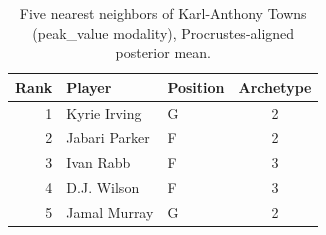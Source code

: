 \begin{table}[htbp]
  \centering\small
  \begin{tabular}{rllc}
    \toprule
    Rank & Player & Position & Archetype \\
    \midrule
    1 & Kyrie Irving & G & 2 \\
    2 & Jabari Parker & F & 2 \\
    3 & Ivan Rabb & F & 3 \\
    4 & D.J. Wilson & F & 3 \\
    5 & Jamal Murray & G & 2 \\
    \bottomrule
  \end{tabular}
  \caption{Five nearest neighbors of Karl-Anthony Towns (peak_value modality), Procrustes-aligned posterior mean.}
  \label{tab:Karl_Anthony_Towns_neighbors_peak_value}
\end{table}

